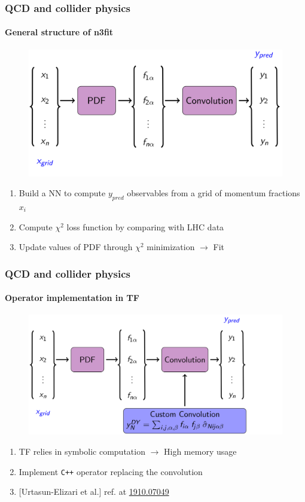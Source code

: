 \documentclass[aspectratio=43]{beamer}
\begin{document}
\begin{frame}
	
	\frametitle{QCD and collider physics}
	\framesubtitle{General structure of n3fit}
	
	\footnotesize
	
	\begin{figure}
		\includegraphics[width = 9 cm]{plots/backup/n3fit1.png}
	\end{figure}	
	
	\begin{enumerate}
		\item Build a NN to compute $y_{pred}$ observables from a grid of momentum fractions $x_{i}$
		\item Compute $\chi^{2}$ loss function by comparing with LHC data
		\item Update values of PDF through $\chi^{2}$ minimization $\longrightarrow$ {\color{violet} Fit}
	\end{enumerate}
	
	\end{frame}

\begin{frame}
	
	\frametitle{QCD and collider physics}
	\framesubtitle{Operator implementation in TF}
	
	\footnotesize
	
	\begin{figure}
		\includegraphics[width = 10.5 cm]{plots/backup/n3fit2.png}
	\end{figure}
	
	\begin{enumerate}
		\item TF relies in symbolic computation $\longrightarrow$ High memory usage
		\item Implement \texttt{C++} operator replacing the convolution
		\item {\color{blue}[Urtasun-Elizari et al.]} ref. at {\color{blue} \href{https://arxiv.org/abs/1910.07049}{1910.07049}}
	\end{enumerate}

\end{frame}
\end{document}
